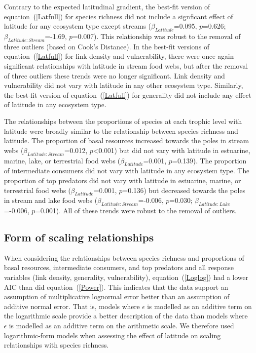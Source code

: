 \documentclass[12pt]{article}
\begin{document}
  Contrary to the expected latitudinal gradient, the best-fit version of
  equation~(\ref{Latfull}) for species richness did not include a signficant effect of latitude for any ecosystem type except streams
  ($\beta_{Latitude}$=0.095, $p$=0.626; $\beta_{Latitude:Stream}$=-1.69, $p$=0.007).  This
  relationship was robust to the removal of three outliers (based on Cook's Distance). In the best-fit versions of
  equation~(\ref{Latfull}) for link density and vulnerability, there were once again
  significant relationships with latitude in stream food webs, but after the removal of three outliers these trends
  were no longer significant. Link density and vulnerability did not vary with latitude in any other ecosystem type.
  Similarly, the best-fit version of equation~(\ref{Latfull}) for generality did not include any effect of
  latitude in any ecosystem type. 


  The relationships between the proportions of species at each trophic level with latitude were broadly similar
  to the relationship between species richness and latitude. 
  The proportion of basal resources increased towards the poles in stream webs ($\beta_{Latitude:Stream}$=0.012, $p$\textless0.001) 
  but did not vary with latitude in estuarine, marine, lake, or terrestrial 
  food webs ($\beta_{Latitude}$=0.001, $p$=0.139).
  The proportion of intermediate consumers did not vary with latitude in any ecosystem type.
  The proportion of top predators did not vary with latitude in 
  estuarine, marine, or terrestrial food webs ($\beta_{Latitude}$=0.001, $p$=0.136) but decreased towards the poles in stream and lake food 
  webs ($\beta_{Latitude:Stream}$=-0.006, $p$=0.030; 
  $\beta_{Latitude:Lake}$=-0.006, $p$=0.001). 
  All of these trends were robust to the removal of outliers.


\subsection*{Form of scaling relationships}

  When considering the relationships between species richness and proportions 
  of basal resources, intermediate consumers, and top predators and all response variables 
  (link density, generality, vulnerability), equation~(\ref{Loglog}) had a
  lower AIC than did equation~(\ref{Power}). This indicates that the
  data support an assumption of multiplicative lognormal error better than an
  assumption of additive normal error. That is, models where $\epsilon$ is
  modelled as an additive term on
  the logarithmic scale provide a better description of the data than models
  where $\epsilon$ is modelled as an additive term on the arithmetic scale.  
  We therefore used logarithmic-form models when assessing the
  effect of latitude on scaling relationships  with species richness.
\end{document}
